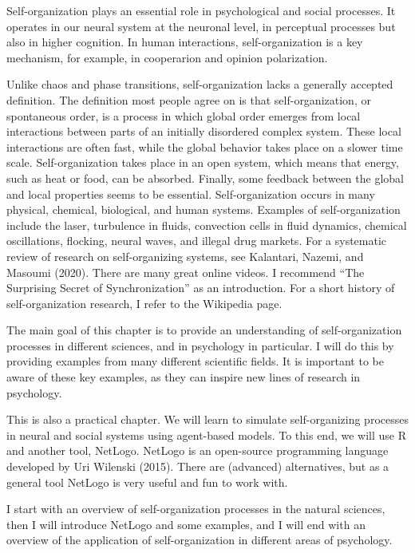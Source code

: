 \documentclass[
  a4paper,
  DIV=11,
  numbers=noendperiod,
  oneside]{scrreprt}
\begin{document}
Self-organization plays an essential role in psychological and social
processes. It operates in our neural system at the neuronal level, in
perceptual processes but also in higher cognition. In human
interactions, self-organization is a key mechanism, for example, in
cooperarion and opinion polarization.

Unlike chaos and phase transitions, self-organization lacks a generally
accepted definition. The definition most people agree on is that
self-organization, or spontaneous order, is a process in which global
order emerges from local interactions between parts of an initially
disordered complex system. These local interactions are often fast,
while the global behavior takes place on a slower time scale.
Self-organization takes place in an open system, which means that
energy, such as heat or food, can be absorbed. Finally, some feedback
between the global and local properties seems to be essential.
Self-organization occurs in many physical, chemical, biological, and
human systems. Examples of self-organization include the laser,
turbulence in fluids, convection cells in fluid dynamics, chemical
oscillations, flocking, neural waves, and illegal drug markets. For a
systematic review of research on self-organizing systems, see Kalantari,
Nazemi, and Masoumi (2020). There are many great online videos. I
recommend ``The Surprising Secret of Synchronization'' as an
introduction. For a short history of self-organization research, I refer
to the Wikipedia page.

The main goal of this chapter is to provide an understanding of
self-organization processes in different sciences, and in psychology in
particular. I will do this by providing examples from many different
scientific fields. It is important to be aware of these key examples, as
they can inspire new lines of research in psychology.

This is also a practical chapter. We will learn to simulate
self-organizing processes in neural and social systems using agent-based
models. To this end, we will use R and another tool, NetLogo. NetLogo is
an open-source programming language developed by Uri Wilenski (2015).
There are (advanced) alternatives, but as a general tool NetLogo is very
useful and fun to work with.

I start with an overview of self-organization processes in the natural
sciences, then I will introduce NetLogo and some examples, and I will
end with an overview of the application of self-organization in
different areas of psychology.
\end{document}
